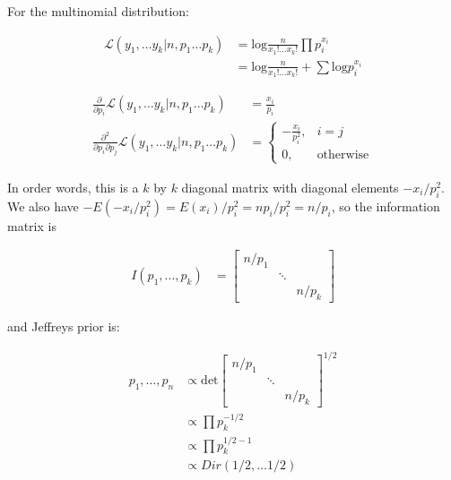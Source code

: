 \documentclass[11pt]{article}
\begin{document}
For the multinomial distribution:

\begin{align*}
   \mathcal{L}(y_1, \ldots y_k| n, p_1 \ldots p_k) &= \text{log} \frac{n}{x_1! \ldots x_k!} \prod p_i^{x_i}\\
   &= \text{log} \frac{n}{x_1! \ldots x_k!}  + \sum \text{log} p_i^{x_i}
\end{align*}


\begin{align*}
   \frac{\partial}{\partial p_i}\mathcal{L}(y_1, \ldots y_k| n, p_1 \ldots p_k) 
   &=   \frac{x_i}{p_i}\\
   \frac{\partial^2}{\partial p_i \partial p_j}\mathcal{L}(y_1, \ldots y_k| n, p_1 \ldots p_k) &= \begin{cases}
  -\frac{x_i}{p_i^2},  &  i = j \\
  0, & \text{otherwise}
\end{cases}
\end{align*}

In order words, this is a $k$ by $k$ diagonal matrix with diagonal elements $ -x_i/p_i^2$. We also have $-E(-x_i/p_i^2)  = E(x_i)/p_i^2 = n p_i/p_i^2 = n/p_i$, so the information matrix is

\begin{align*}
    I(p_1, \dots, p_k) &=  \begin{bmatrix}
    n/p_1 & & \\
    & \ddots & \\
    & & n/p_k
  \end{bmatrix}
\end{align*}

and Jeffreys prior is:

\begin{align*}
    p_1, 
    \ldots, p_n&\propto \text{det}\begin{bmatrix}
    n/p_1 & & \\
    & \ddots & \\
    & & n/p_k
  \end{bmatrix}^{1/2}\\
  &\propto \prod p_k^{-1/2}\\
  &\propto \prod p_k^{1/2-1}\\
  &\propto Dir(1/2, \dots 1/2)
\end{align*}
\end{document}
